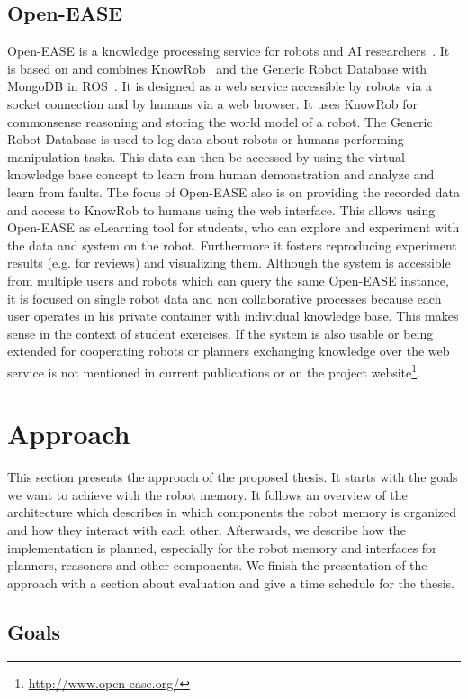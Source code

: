 \documentclass[a4paper,11pt]{article}
\begin{document}
\subsection{Open-EASE}
\label{sec:openease}
Open-EASE is a knowledge processing service for robots and AI
researchers~\cite{OpenEASE}. It is based on and combines
KnowRob~\cite{KnowRob} and the Generic Robot Database with MongoDB in
ROS~\cite{RoboDB}. It is designed as a web service accessible by
robots via a socket connection and by humans via a web browser. It
uses KnowRob for commonsense reasoning and storing the world model of
a robot. The Generic Robot Database is used to log data about robots
or humans performing manipulation tasks. This data can then be
accessed by using the virtual knowledge base concept to
learn from human demonstration and analyze and learn from faults. The
focus of Open-EASE also is on providing the recorded data and access
to KnowRob to humans using the web interface. This allows using
Open-EASE as eLearning tool for students, who can explore and
experiment with the data and system on the robot. Furthermore it
fosters reproducing experiment results (e.g. for reviews) and
visualizing them. Although the system is accessible from multiple
users and robots which can query the same Open-EASE instance, it is
focused on single robot data and non collaborative processes because
each user operates in his private container with individual knowledge
base. This makes sense in the context of student exercises. If the
system is also usable or being extended for cooperating robots or
planners exchanging knowledge over the web service is not mentioned in
current publications or on the project
website\footnote{\url{http://www.open-ease.org/}}.


\section{Approach}
\label{sec:approach}
This section presents the approach of the proposed thesis. It starts
with the goals we want to achieve with the robot memory.
It follows an overview of the
architecture which describes in which components the robot memory is
organized and how they interact with each other. Afterwards, we
describe how the implementation is planned, especially for the robot
memory and interfaces for planners, reasoners and other
components. We finish the presentation of the approach with a section
about evaluation and give a time schedule for the thesis.

\subsection{Goals}
\label{sec:goals}
\end{document}
